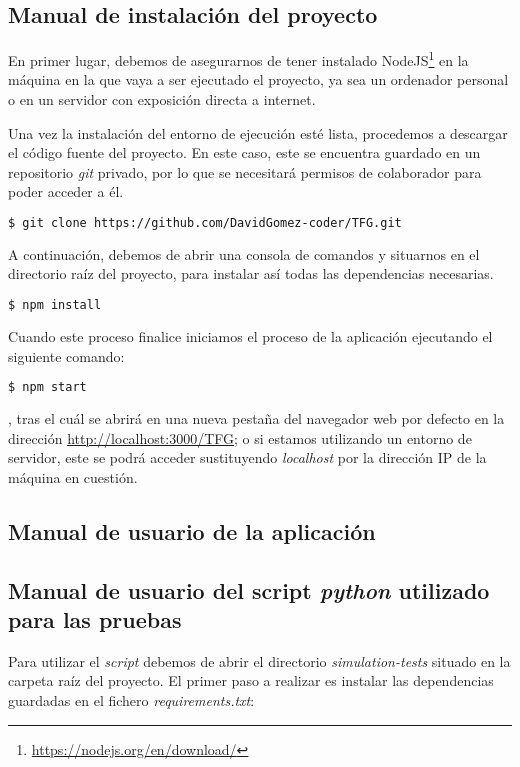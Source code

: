 \documentclass[../main.tex]{subfiles}
\begin{document}
\subsection{Manual de instalación del proyecto}
En primer lugar, debemos de asegurarnos de tener instalado NodeJS\footnote{\url{ https://nodejs.org/en/download/}} en la máquina en la que vaya a ser ejecutado el proyecto, ya sea un ordenador personal o en un servidor con exposición directa a internet.

Una vez la instalación del entorno de ejecución esté lista, procedemos a descargar el código fuente del proyecto. En este caso, este se encuentra guardado en un repositorio \textit{git} privado, por lo que se necesitará permisos de colaborador para poder acceder a él. 

\begin{lstlisting}[language=bash]
  $ git clone https://github.com/DavidGomez-coder/TFG.git
\end{lstlisting}

A continuación, debemos de abrir una consola de comandos y situarnos en el directorio raíz del proyecto, para instalar así todas las dependencias necesarias. 

\begin{lstlisting}[language=bash]
  $ npm install
\end{lstlisting}

Cuando este proceso finalice iniciamos el proceso de la aplicación ejecutando el siguiente comando:

\begin{lstlisting}[language=bash]
  $ npm start
\end{lstlisting}

, tras el cuál se abrirá en una nueva pestaña del navegador web por defecto en la dirección \url{http://localhost:3000/TFG}; o si estamos utilizando un entorno de servidor, este se podrá acceder sustituyendo \textit{localhost} por la dirección IP de la máquina en cuestión.



\subsection{Manual de usuario de la aplicación}
\blindtext

\subsection{Manual de usuario del script \textit{python} utilizado para las pruebas}
Para utilizar el \textit{script} debemos de  abrir el directorio \textit{simulation-tests} situado en la carpeta raíz del proyecto. El primer paso a realizar es instalar las dependencias guardadas en el fichero \textit{requirements.txt}:
\end{document}
